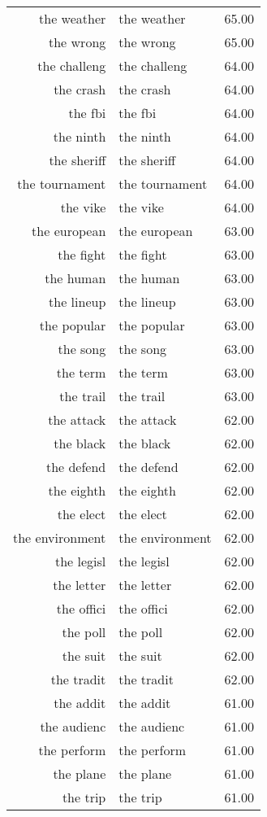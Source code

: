 \begin{table}[ht]
\begin{tabular}{rlr}
  the weather & the weather & 65.00 \\ 
  the wrong & the wrong & 65.00 \\ 
  the challeng & the challeng & 64.00 \\ 
  the crash & the crash & 64.00 \\ 
  the fbi & the fbi & 64.00 \\ 
  the ninth & the ninth & 64.00 \\ 
  the sheriff & the sheriff & 64.00 \\ 
  the tournament & the tournament & 64.00 \\ 
  the vike & the vike & 64.00 \\ 
  the european & the european & 63.00 \\ 
  the fight & the fight & 63.00 \\ 
  the human & the human & 63.00 \\ 
  the lineup & the lineup & 63.00 \\ 
  the popular & the popular & 63.00 \\ 
  the song & the song & 63.00 \\ 
  the term & the term & 63.00 \\ 
  the trail & the trail & 63.00 \\ 
  the attack & the attack & 62.00 \\ 
  the black & the black & 62.00 \\ 
  the defend & the defend & 62.00 \\ 
  the eighth & the eighth & 62.00 \\ 
  the elect & the elect & 62.00 \\ 
  the environment & the environment & 62.00 \\ 
  the legisl & the legisl & 62.00 \\ 
  the letter & the letter & 62.00 \\ 
  the offici & the offici & 62.00 \\ 
  the poll & the poll & 62.00 \\ 
  the suit & the suit & 62.00 \\ 
  the tradit & the tradit & 62.00 \\ 
  the addit & the addit & 61.00 \\ 
  the audienc & the audienc & 61.00 \\ 
  the perform & the perform & 61.00 \\ 
  the plane & the plane & 61.00 \\ 
  the trip & the trip & 61.00 \\ 

\end{tabular}
\end{table}
